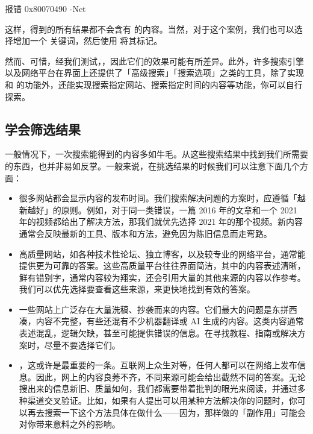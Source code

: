 \begin{quoting}
  报错 0x80070490 -Net
\end{quoting}

这样，得到的所有结果都不会含有  的内容。当然，对于这个案例，我们也可以选择增加一个  关键词，然后使用 \MissingVerb{+} 将其标记。

然而、可惜，经我们测试，，因此它们的效果可能有所差异。此外，许多搜索引擎以及网络平台在界面上还提供了「高级搜索」「搜索选项」之类的工具，除了实现 \MissingVerb{+} 和 \MissingVerb{-} 的功能外，还能实现搜索指定网站、搜索指定时间的内容等功能，你可以自行探索。

\subsection{学会筛选结果}

一般情况下，一次搜索能得到的内容多如牛毛。从这些搜索结果中找到我们所需要的东西，也并非易如反掌。一般来说，在挑选结果的时候我们可以注意下面几个方面：

\begin{itemize}
  \item {}很多网站都会显示内容的发布时间。我们搜索解决问题的方案时，应遵循「越新越好」的原则。例如，对于同一类错误，一篇 2016 年的文章和一个 2021 年的视频都给出了解决方法，那我们就优先选择 2021 年的那个视频。新内容通常会反映最新的工具、版本和方法，避免因为陈旧信息而走弯路。
  \item {}高质量网站，如各种技术性论坛、独立博客，以及较专业的网络平台，通常能提供更为可靠的答案。这些高质量平台往往界面简洁，其中的内容表述清晰，鲜有错别字，通常内容较为翔实，还会引用大量的其他来源的内容以作参考。我们可以优先选择要查看这些来源，来更快地找到有效的答案。
  \item {}一些网站上广泛存在大量洗稿、抄袭而来的内容。它们最大的问题是东拼西凑，内容不完整，有些还混有不少机器翻译或 AI 生成的内容。这类内容通常表述混乱，逻辑欠缺，甚至可能提供错误的信息。在寻找教程、指南或解决方案时，尽量不要选择它们。
  \item {}，这或许是最重要的一条。互联网上众生对等，任何人都可以在网络上发布信息。因此，网上的内容良莠不齐，不同来源可能会给出截然不同的答案。无论搜出来的信息新旧、质量如何，我们都需要带着批判的眼光来阅读，并通过多种渠道交叉验证。比如，如果有人提出可以用某种方法解决你的问题时，你可以再去搜索一下这个方法具体在做什么——因为，那样做的「副作用」可能会对你带来意料之外的影响。
\end{itemize}

